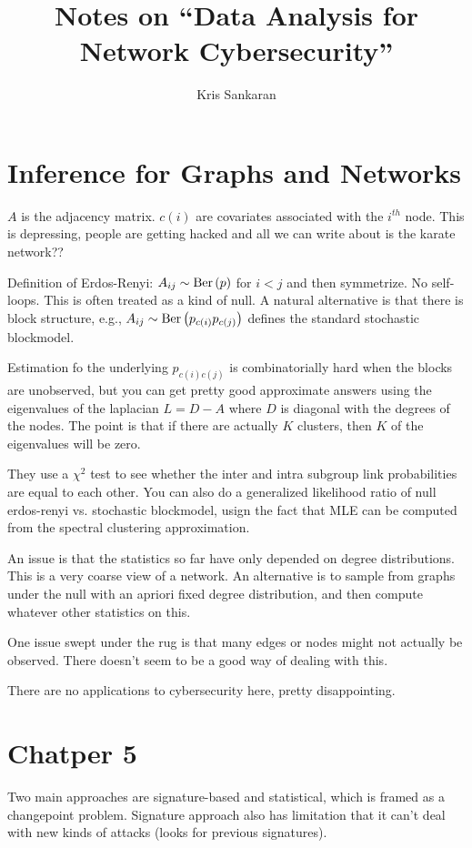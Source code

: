 \documentclass{article}
\title{Notes on ``Data Analysis for Network Cybersecurity''}
\author{Kris Sankaran}
\begin{document}
\section{Inference for Graphs and Networks}
\label{sec:chapter1}

$A$ is the adjacency matrix. $c\left(i\right)$ are covariates associated with
the $i^{th}$ node. This is depressing, people are getting hacked and all we can
write about is the karate network??

Definition of Erdos-Renyi: $A_{ij} \sim \textnormal{Ber}\left(p\right)$ for $i < j$ and then
symmetrize. No self-loops. This is often treated as a kind of null. A natural
alternative is that there is block structure, e.g.,
$A_{ij} \sim \textnormal{Ber}\left(p_{c\left(i\right)}p_{c\left(j\right)}\right)$ defines
the standard stochastic blockmodel.

Estimation fo the underlying $p_{c\left(i\right)c\left(j\right)}$ is
combinatorially hard when the blocks are unobserved, but you can get pretty good
approximate answers using the eigenvalues of the laplacian $L = D - A$ where $D$
is diagonal with the degrees of the nodes. The point is that if there are
actually $K$ clusters, then $K$ of the eigenvalues will be zero.

They use a $\chi^{2}$ test to see whether the inter and intra subgroup link
probabilities are equal to each other. You can also do a generalized likelihood
ratio of null erdos-renyi vs. stochastic blockmodel, usign the fact that MLE can
be computed from the spectral clustering approximation.

An issue is that the statistics so far have only depended on degree
distributions. This is a very coarse view of a network. An alternative is to
sample from graphs under the null with an apriori fixed degree distribution, and
then compute whatever other statistics on this.

One issue swept under the rug is that many edges or nodes might not actually be
observed. There doesn't seem to be a good way of dealing with this.

There are no applications to cybersecurity here, pretty disappointing.

\section{Chatper 5}
\label{sec:chapter_5}

Two main approaches are signature-based and statistical, which is framed as a
changepoint problem. Signature approach also has limitation that it can't deal
with new kinds of attacks (looks for previous signatures).
\end{document}
